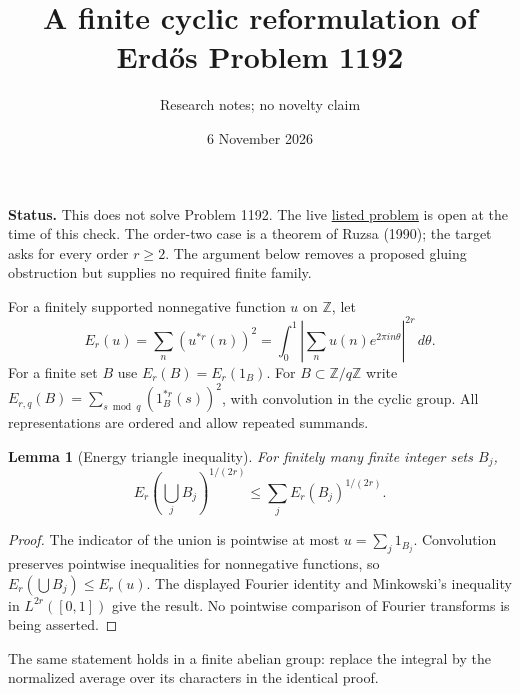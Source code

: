 \documentclass[11pt]{article}
\title{A finite cyclic reformulation of Erd\H{o}s Problem 1192}
\author{Research notes; no novelty claim}
\date{6 November 2026}
\newtheorem{lemma}{Lemma}
\begin{document}
\maketitle

\noindent\textbf{Status.} This does not solve Problem 1192. The live
\href{https://conjectures.io/problems/erdos1192-erdos-1192}{listed problem}
is open at the time of this check. The order-two case is a theorem of
Ruzsa (1990); the target asks for every order $r\ge2$. The argument below
removes a proposed gluing obstruction but supplies no required finite family.

For a finitely supported nonnegative function $u$ on $\mathbb Z$, let
\[
 E_r(u)=\sum_n (u^{*r}(n))^2
       =\int_0^1\left|\sum_n u(n)e^{2\pi in\theta}\right|^{2r}\,d\theta.
\]
For a finite set $B$ use $E_r(B)=E_r(1_B)$. For $B\subset\mathbb Z/q\mathbb Z$
write $E_{r,q}(B)=\sum_{s\bmod q} (1_B^{*r}(s))^2$, with convolution in the
cyclic group. All representations are ordered and allow repeated summands.

\begin{lemma}[Energy triangle inequality]
For finitely many finite integer sets $B_j$,
\[
 E_r\left(\bigcup_j B_j\right)^{1/(2r)}
 \le \sum_j E_r(B_j)^{1/(2r)}.
\]
\end{lemma}
\begin{proof}
The indicator of the union is pointwise at most $u=\sum_j1_{B_j}$.
Convolution preserves pointwise inequalities for nonnegative functions, so
$E_r(\bigcup B_j)\le E_r(u)$. The displayed Fourier identity and Minkowski's
inequality in $L^{2r}([0,1])$ give the result. No pointwise comparison of
Fourier transforms is being asserted.
\end{proof}
The same statement holds in a finite abelian group: replace the integral
by the normalized average over its characters in the identical proof.
\end{document}
